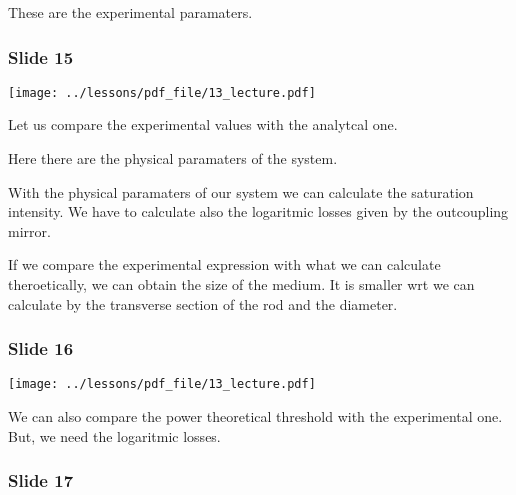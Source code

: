 \documentclass[../main/main.tex]{subfiles}
\begin{document}
These are the experimental paramaters.

\subsubsection*{Slide 15}

\begin{minipage}[]{0.5\linewidth}
\centering
\texttt{[image: ../lessons/pdf\_file/13\_lecture.pdf]}
\end{minipage}
\hspace{0.3cm}\vspace{0.3cm}
\begin{minipage}[c]{0.47\linewidth}

Let us compare the experimental values with the analytcal one.

Here there are the physical paramaters of the system.

With the physical paramaters of our system we can calculate the saturation intensity. We have to calculate also the logaritmic losses given by the outcoupling mirror.

If we compare the experimental expression with what we can calculate theroetically, we can obtain the size of the medium. It is smaller wrt we can calculate by the transverse section of the rod and the diameter.

\end{minipage}

\subsubsection*{Slide 16}

\begin{minipage}[]{0.5\linewidth}
\centering
\texttt{[image: ../lessons/pdf\_file/13\_lecture.pdf]}
\end{minipage}
\hspace{0.3cm}\vspace{0.3cm}
\begin{minipage}[c]{0.47\linewidth}

We can also compare the power theoretical threshold with the experimental one. But, we need the logaritmic losses.

\end{minipage}

\subsubsection*{Slide 17}
\end{document}
